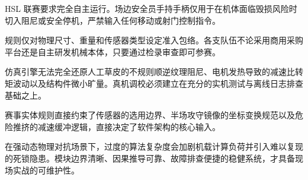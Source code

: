 \begin{description}[leftmargin=0pt,style=nextline]
    \item[“机器人是遥控的吧？”] HSL 联赛要求完全自主运行。场边安全员手持手柄仅用于在机体面临毁损风险时切入阻尼或安全停机，严禁输入任何移动或射门控制指令。
    \item[“必须购买官方指定整机？”] 规则仅对物理尺寸、重量和传感器类型设定准入包络。各支队伍不论采用商用采购平台还是自主研发机械本体，只要通过检录审查即可参赛。
    \item[“仿真环境跑通了，真机自然能行。”] 仿真引擎无法完全还原人工草皮的不规则顺逆纹理阻尼、电机发热导致的减速比转矩波动以及结构件微小旷量。真机调校必须建立在充分的实机测试与离线日志排查基础之上。
    \item[“规则是裁判的事，跟写代码关系不大。”] 赛事实体规则直接约束了传感器的选用边界、半场攻守镜像的坐标变换规范以及危险推挤的减速缓冲逻辑，直接决定了软件架构的核心输入。
    \item[“算法设计越复杂越先进。”] 在强动态物理对抗场景下，过度的算法复杂度会加剧机载计算负荷并引入难以复现的死锁隐患。模块边界清晰、因果推导可靠、故障排查便捷的稳健系统，才具备现场实战的可维护性。
\end{description}

\newpage